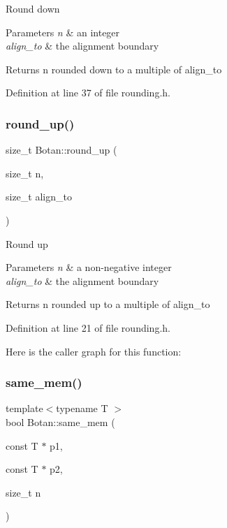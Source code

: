Round down 
\begin{DoxyParams}{Parameters}
{\em n} & an integer \\
\hline
{\em align\+\_\+to} & the alignment boundary \\
\hline
\end{DoxyParams}
\begin{DoxyReturn}{Returns}
n rounded down to a multiple of align\+\_\+to 
\end{DoxyReturn}


Definition at line 37 of file rounding.\+h.

\mbox{\label{namespace_botan_af02949267c5d95ff4e34cb64c5404a4f}} 
\subsubsection{\texorpdfstring{round\+\_\+up()}{round\_up()}}
{\footnotesize\ttfamily size\+\_\+t Botan\+::round\+\_\+up (\begin{DoxyParamCaption}\item[{size\+\_\+t}]{n,  }\item[{size\+\_\+t}]{align\+\_\+to }\end{DoxyParamCaption})\hspace{0.3cm}{\ttfamily [inline]}}

Round up 
\begin{DoxyParams}{Parameters}
{\em n} & a non-\/negative integer \\
\hline
{\em align\+\_\+to} & the alignment boundary \\
\hline
\end{DoxyParams}
\begin{DoxyReturn}{Returns}
n rounded up to a multiple of align\+\_\+to 
\end{DoxyReturn}


Definition at line 21 of file rounding.\+h.

Here is the caller graph for this function\+:
\mbox{\label{namespace_botan_abaf9f9ec7cd1cb34fa0a9b98592fcb84}} 
\subsubsection{\texorpdfstring{same\+\_\+mem()}{same\_mem()}}
{\footnotesize\ttfamily template$<$typename T $>$ \\
bool Botan\+::same\+\_\+mem (\begin{DoxyParamCaption}\item[{const T $\ast$}]{p1,  }\item[{const T $\ast$}]{p2,  }\item[{size\+\_\+t}]{n }\end{DoxyParamCaption})\hspace{0.3cm}{\ttfamily [inline]}}

